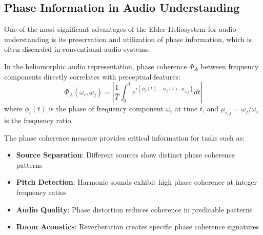 \subsection{Phase Information in Audio Understanding}

One of the most significant advantages of the Elder Heliosystem for audio understanding is its preservation and utilization of phase information, which is often discarded in conventional audio systems.

\begin{theorem}
In the heliomorphic audio representation, phase coherence $\Phi_A$ between frequency components directly correlates with perceptual features:
\begin{equation}
\Phi_A(\omega_i, \omega_j) = \left| \frac{1}{T} \int_0^T e^{i(\phi_i(t) - \phi_j(t) \cdot \mu_{i,j})} dt \right|
\end{equation}
where $\phi_i(t)$ is the phase of frequency component $\omega_i$ at time $t$, and $\mu_{i,j} = \omega_j/\omega_i$ is the frequency ratio.
\end{theorem}

The phase coherence measure provides critical information for tasks such as:
\begin{itemize}
    \item \textbf{Source Separation}: Different sources show distinct phase coherence patterns
    \item \textbf{Pitch Detection}: Harmonic sounds exhibit high phase coherence at integer frequency ratios
    \item \textbf{Audio Quality}: Phase distortion reduces coherence in predicable patterns
    \item \textbf{Room Acoustics}: Reverberation creates specific phase coherence signatures
\end{itemize}

